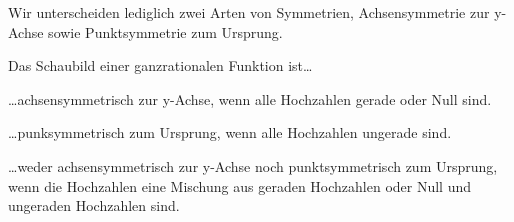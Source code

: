 Wir unterscheiden lediglich zwei Arten von Symmetrien, Achsensymmetrie zur y-Achse sowie Punktsymmetrie zum Ursprung.
\begin{tcolorbox}\centering
	\textcolor{loestc}{Das Schaubild einer ganzrationalen Funktion ist\dots}

	\textcolor{loestc}{\dots achsensymmetrisch zur y-Achse, wenn alle Hochzahlen gerade oder Null sind.}

	\textcolor{loestc}{\dots punksymmetrisch zum Ursprung, wenn alle Hochzahlen ungerade sind.}

	\textcolor{loestc}{\dots weder achsensymmetrisch zur y-Achse noch punktsymmetrisch zum Ursprung, wenn die Hochzahlen eine Mischung aus geraden Hochzahlen oder Null und ungeraden Hochzahlen sind.}
\end{tcolorbox}
